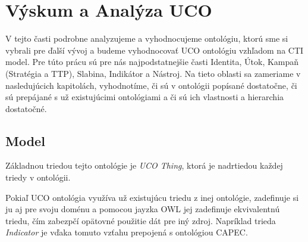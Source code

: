 \documentclass[12pt, a4paper, oneside]{book}
\begin{document}
\chapter{Výskum a Analýza UCO}

V tejto časti podrobne analyzujeme a vyhodnocujeme ontológiu\citep{ucoSource}, ktorú sme si vybrali pre ďalší vývoj a budeme vyhodnocovať UCO ontológiu vzhľadom na CTI model. Pre túto prácu sú pre nás najpodstatnejšie časti Identita, Útok, Kampaň (Stratégia a TTP), Slabina, Indikátor a Nástroj. Na tieto oblasti sa zameriame v nasledujúcich kapitolách, vyhodnotíme, či sú v ontológii popísané dostatočne, či sú prepájané s už existujúcimi ontológiami a či sú ich vlastnosti a hierarchia dostatočné. 


\section{Model}

Základnou triedou tejto ontológie je \textit{UCO Thing}, ktorá je nadrtiedou každej triedy v ontológii.


Pokiaľ UCO ontológia využíva už existujúcu triedu z inej ontológie, zadefinuje si ju aj pre svoju doménu a pomocou jayzka OWL jej zadefinuje ekvivalentnú triedu, čím zabezpčí opätovné použitie dát pre iný zdroj. Napríklad trieda \textit{Indicator} je vďaka tomuto vzťahu prepojená s ontológiou CAPEC.

\end{document}
